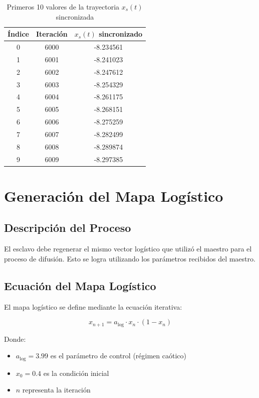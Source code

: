 \documentclass[12pt,a4paper]{article}
\begin{document}
	\begin{table}[H]
		\centering
		\caption{Primeros 10 valores de la trayectoria $x_s(t)$ sincronizada}
		\label{tab:x_sinc}
		\begin{tabular}{@{}ccc@{}}
			\toprule
			\textbf{Índice} & \textbf{Iteración} & \textbf{$x_s(t)$ sincronizado} \\ \midrule
			0 & 6000 & -8.234561 \\
			1 & 6001 & -8.241023 \\
			2 & 6002 & -8.247612 \\
			3 & 6003 & -8.254329 \\
			4 & 6004 & -8.261175 \\
			5 & 6005 & -8.268151 \\
			6 & 6006 & -8.275259 \\
			7 & 6007 & -8.282499 \\
			8 & 6008 & -8.289874 \\
			9 & 6009 & -8.297385 \\ \bottomrule
		\end{tabular}
	\end{table}
	
	\section{Generación del Mapa Logístico}
	
	\subsection{Descripción del Proceso}
	
	El esclavo debe regenerar el mismo vector logístico que utilizó el maestro para el proceso de difusión. Esto se logra utilizando los parámetros recibidos del maestro.
	
	\subsection{Ecuación del Mapa Logístico}
	
	El mapa logístico se define mediante la ecuación iterativa:
	
	$$x_{n+1} = a_{\text{log}} \cdot x_n \cdot (1 - x_n)$$
	
	Donde:
	\begin{itemize}
		\item $a_{\text{log}} = 3.99$ es el parámetro de control (régimen caótico)
		\item $x_0 = 0.4$ es la condición inicial
		\item $n$ representa la iteración
	\end{itemize}
	
\end{document}
